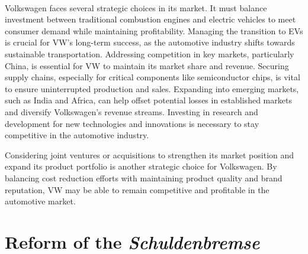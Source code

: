 \documentclass[10pt]{article}
\begin{document}
\


\noindent Volkswagen faces several strategic choices in its market. It must balance investment between traditional combustion engines and electric vehicles to meet consumer demand while maintaining profitability. Managing the transition to EVs is crucial for VW's long-term success, as the automotive industry shifts towards sustainable transportation. Addressing competition in key markets, particularly China, is essential for VW to maintain its market share and revenue. Securing supply chains, especially for critical components like semiconductor chips, is vital to ensure uninterrupted production and sales. Expanding into emerging markets, such as India and Africa, can help offset potential losses in established markets and diversify Volkswagen's revenue streams. Investing in research and development for new technologies and innovations is necessary to stay competitive in the automotive industry.

Considering joint ventures or acquisitions to strengthen its market position and expand its product portfolio is another strategic choice for Volkswagen. By balancing cost reduction efforts with maintaining product quality and brand reputation, VW may be able to remain competitive and profitable in the automotive market\autocite{VolkswagensEarningsDisappoint09:07:19+01:00}.

\section{Reform of the \textit{Schuldenbremse}}
\end{document}
